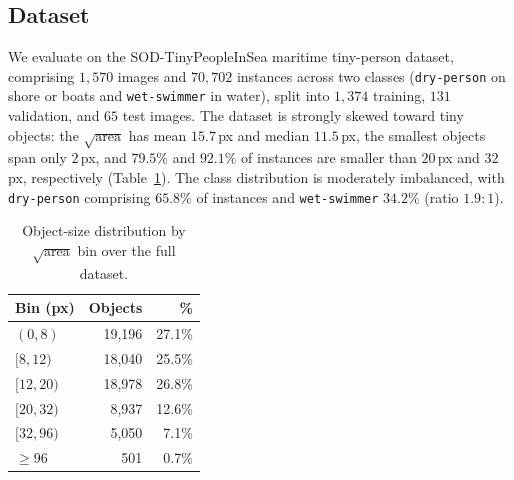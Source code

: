 
\subsection{Dataset}
\label{sec:exp-dataset}

We evaluate on the SOD-TinyPeopleInSea maritime tiny-person dataset,
comprising $1{,}570$ images and $70{,}702$ instances across two classes
(\texttt{dry-person} on shore or boats and \texttt{wet-swimmer} in water),
split into $1{,}374$ training, $131$ validation, and $65$ test images. The
dataset is strongly skewed toward tiny objects: the $\sqrt{\text{area}}$ has
mean $15.7$\,px and median $11.5$\,px, the smallest objects span only
$2$\,px, and $79.5\%$ and $92.1\%$ of instances are smaller than $20$\,px
and $32$\,px, respectively (Table~\ref{tab:exp-eda}). The class distribution
is moderately imbalanced, with \texttt{dry-person} comprising $65.8\%$ of
instances and \texttt{wet-swimmer} $34.2\%$ (ratio $1.9:1$).

\begin{table}[t]
\centering
\caption{\texorpdfstring{Object-size distribution by $\sqrt{\text{area}}$ bin over the full dataset.}{Object-size distribution.}}
\label{tab:exp-eda}
\small
\begin{tabular}{lrr}
\toprule
Bin (px) & Objects & \% \\
\midrule
$(0,8)$    & 19{,}196 & 27.1\% \\
$[8,12)$   & 18{,}040 & 25.5\% \\
$[12,20)$  & 18{,}978 & 26.8\% \\
$[20,32)$  & 8{,}937  & 12.6\% \\
$[32,96)$  & 5{,}050  & 7.1\% \\
$\geq 96$  & 501     & 0.7\% \\
\bottomrule
\end{tabular}
\end{table}

